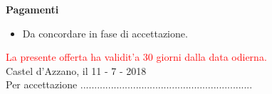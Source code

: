 \documentclass[a4paper]{article}
\begin{document}
                          \noindent\textbf{Pagamenti}
                          \begin{itemize}
                              \item Da concordare in fase di accettazione.
                          \end{itemize}

                          \textcolor{red}{La presente offerta ha validit'a 30 giorni dalla data odierna.}\\

                          Castel d'Azzano, il 11 - 7 - 2018
                          \vspace{1cm}\\
                          Per accettazione ..............................................................

                        
\end{document}
